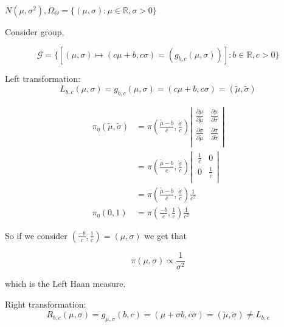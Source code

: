 \documentclass[11pt,fleqn]{book} %
\begin{document}
\begin{example}
	$N(\mu, \sigma^2), \Omega_\Theta = \{(\mu, \sigma): \mu \in \mathbb{R}, \sigma > 0\}$

	Consider group, 

			$$\mathcal{G} = \{[(\mu, \sigma) \mapsto (c\mu+ b, c\sigma) = (g_{b,c}(\mu, \sigma))]: b \in \mathbb{R}, c > 0 \} $$

	Left transformation:\\

			$$L_{b, c} (\mu, \sigma) = g_{b, c}(\mu, \sigma) = (c\mu + b, c\sigma) = (\tilde{\mu} , \tilde{\sigma}) $$

			\begin{align*}
				\pi_\eta(\tilde{\mu} , \tilde{\sigma}) &= \pi(\frac{\tilde{\mu}- b}{c}, \frac{\tilde{\sigma}}{c}) \left|\begin{matrix}
					\frac{\partial \mu}{\partial \tilde{\mu}} & \frac{\partial \mu}{\partial \tilde{\sigma}}\\
					\frac{\partial \sigma}{\partial \tilde{\mu}} & \frac{\partial \sigma}{\partial \tilde{\sigma}}\\
					\end{matrix}\right|\\
				&=\pi(\frac{\tilde{\mu}- b}{c}, \frac{\tilde{\sigma}}{c}) \left|\	\begin{matrix}
					\frac{1}{c} & 0\\
					0 & \frac{1}{c}\\
					\end{matrix}\right|\\
				&=\pi(\frac{\tilde{\mu}- b}{c}, \frac{\tilde{\sigma}}{c}) \frac{1}{		c^2}\\
				\pi_\eta(0,1) &= \pi(\frac{- b}{c}, \frac{1}{c}) \frac{1}{c^2}
			\end{align*}

		So if we consider $(\frac{- b}{c}, \frac{1}{c})  = (\mu, \sigma)$ we get that

				$$\pi(\mu, \sigma) \propto \frac{1}{\sigma^2} $$

		which is the Left Haan measure. 


		Right transformation:\\

				$$ R_{b, c} (\mu, \sigma) = g_{\mu, \sigma}(b, c) = (\mu + \sigma b, c\sigma) = (\tilde{\mu}, \tilde{\sigma}) \neq L_{b,c} $$



\end{example}
\end{document}
